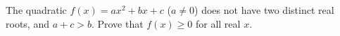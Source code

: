 The quadratic $f(x)=ax^2+bx+c$ ($a\ne0$) does not have two distinct real roots, and $a+c>b$. Prove that $f(x)\ge0$ for all real $x$.
